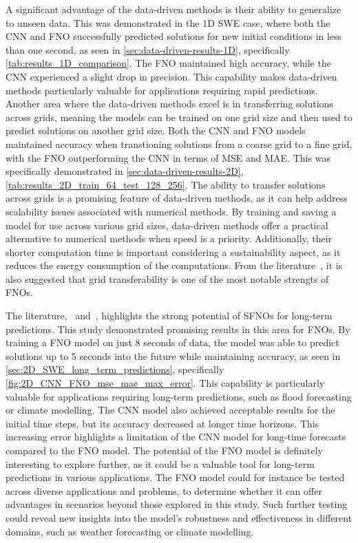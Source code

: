 A significant advantage of the data-driven methods is their ability to generalize to unseen data.
This was demonstrated in the 1D SWE case, where both the CNN and FNO successfully predicted solutions for new initial conditions in less than one second, as seen in \autoref{sec:data-driven-results-1D}, specifically \autoref{tab:results_1D_comparison}.
The FNO maintained high accuracy, while the CNN experienced a slight drop in precision.
This capability makes data-driven methods particularly valuable for applications requiring rapid predictions.
Another area where the data-driven methods excel is in transferring solutions across grids, meaning the models can be trained on one grid size and then used to predict solutions on another grid size.
Both the CNN and FNO models maintained accuracy when transtioning solutions from a coarse grid to a fine grid, with the FNO outperforming the CNN in terms of MSE and MAE.
This was specifically demonstrated in \autoref{sec:data-driven-results-2D}, \autoref{tab:results_2D_train_64_test_128_256}.
The ability to transfer solutions across grids is a promising feature of data-driven methods, as it can help address scalability issues associated with numerical methods.
By training and saving a model for use across various grid sizes, data-driven methods offer a practical alternative to numerical methods when speed is a priority.
Additionally, their shorter computation time is important considering a sustainability aspect, as it reduces the energy consumption of the computations.
From the literature~\cite{FNO_2021}, it is also suggested that grid transferability is one of the most notable strengts of FNOs.

The literature,~\cite{Nvidia2023} and~\cite{bonev2023-SFNO}, highlights the strong potential of SFNOs for long-term predictions.
This study demonstrated promising results in this area for FNOs.
By training a FNO model on just 8 seconds of data, the model was able to predict solutions up to 5 seconds into the future while maintaining accuracy, as seen in \autoref{sec:2D_SWE_long_term_predictions}, specifically \autoref{fig:2D_CNN_FNO_mse_mae_max_error}.
This capability is particularly valuable for applications requiring long-term predictions, such as flood forecasting or climate modelling.
The CNN model also achieved acceptable results for the initial time steps, but its accuracy decreased at longer time horizons.
This increasing error highlights a limitation of the CNN model for long-time forecasts compared to the FNO model.
The potential of the FNO model is definitely interesting to explore further, as it could be a valuable tool for long-term predictions in various applications.
The FNO model could for instance be tested across diverse applications and problems, to determine whether it can offer advantages in scenarios beyond those explored in this study.
Such further testing could reveal new insights into the model's robustness and effectiveness in different domains, such as weather forecasting or climate modelling.

